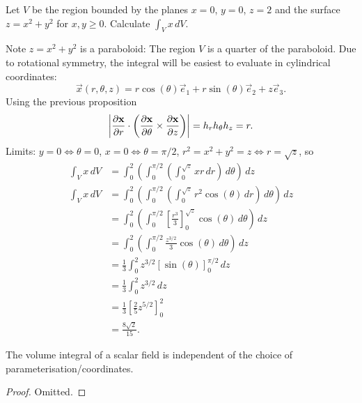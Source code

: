 \documentclass[10pt, a4paper]{article}
\begin{document}
\begin{example}
    Let $V$ be the region bounded by the planes $x = 0$,
    $y = 0$,
    $z = 2$ and the surface $z = x ^ 2 + y ^ 2$ for $x, y \geq 0$.
    Calculate $\int_{V}x\,dV$.

    \begin{solution}
        Note $z = x ^ 2 + y ^ 2$ is a paraboloid:
        The region $V$ is a quarter of the paraboloid.
        Due to rotational symmetry,
        the integral will be easiest to evaluate in cylindrical coordinates:
        \[
        \vec{x}(r, \theta, z) = r\cos(\theta)\vec{e}_1 + r\sin(\theta)\vec{e}_2 + z\vec{e}_3.
        \]
        Using the previous proposition
        \[
        \left|\pd[\vec{x}]{r} \cdot \left(\pd[\vec{x}]{\theta}\times\pd[\vec{x}]{z}\right)\right| = h_rh_{\theta}h_z = r.
        \]
        Limits:
        $y = 0 \iff \theta = 0$,
        $x = 0 \iff \theta = \pi / 2$,
        $r ^ 2 = x ^ 2 + y ^ 2 = z \iff r = \sqrt{z}$,
        so
        \begin{align*}
            \int_{V}x\,dV &= \int_{0}^{2}\left(\int_{0}^{\pi / 2}\left(\int_{0}^{\sqrt{z}}xr\,dr\right)\,d\theta\right)\,dz \\
            \int_{V}x\,dV &= \int_{0}^{2}\left(\int_{0}^{\pi / 2}\left(\int_{0}^{\sqrt{z}}r ^ 2\cos(\theta)\,dr\right)\,d\theta\right)\,dz \\
            &= \int_{0}^{2}\left(\int_{0}^{\pi / 2}\left[\frac{r ^ 3}{3}\right]_{0}^{\sqrt{z}}\cos(\theta)\,d\theta\right)\,dz \\
            &= \int_{0}^{2}\left(\int_{0}^{\pi / 2}\frac{z ^ {3 / 2}}{3}\cos(\theta)\,d\theta\right)\,dz \\
            &= \frac{1}{3}\int_{0}^{2}z ^ {3 / 2}\left[\sin(\theta)\right]_{0}^{\pi / 2}\,dz \\
            &= \frac{1}{3}\int_{0}^{2}z ^ {3 / 2}\,dz \\
            &= \frac{1}{3}\left[\frac{2}{5}z ^ {5 / 2}\right]_{0}^{2} \\
            &= \frac{8\sqrt{2}}{15}.
        \end{align*}
    \end{solution}
\end{example}

\begin{proposition}
    The volume integral of a scalar field is independent of the choice of parameterisation/coordinates.

    \begin{proof}
        Omitted.
    \end{proof}
\end{proposition}
\end{document}
